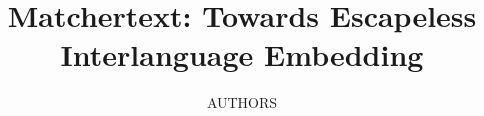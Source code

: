\documentclass[fullpage,twocolumn]{article}
\begin{document}
\title{Matchertext: Towards Escapeless Interlanguage Embedding}

\author{AUTHORS}

\maketitle







\arxiv{

}{

}
\end{document}
